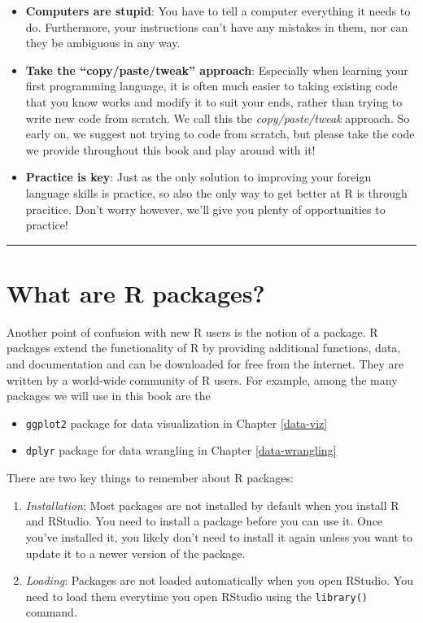 \documentclass[
]{book}
\providecommand{\tightlist}{%
  \setlength{\itemsep}{0pt}\setlength{\parskip}{0pt}}
\begin{document}
\begin{itemize}
\tightlist
\item
  \textbf{Computers are stupid}: You have to tell a computer everything it needs to do. Furthermore, your instructions can't have any mistakes in them, nor can they be ambiguous in any way.
\item
  \textbf{Take the ``copy/paste/tweak'' approach}: Especially when learning your first programming language, it is often much easier to taking existing code that you know works and modify it to suit your ends, rather than trying to write new code from scratch. We call this the \emph{copy/paste/tweak} approach. So early on, we suggest not trying to code from scratch, but please take the code we provide throughout this book and play around with it!
\item
  \textbf{Practice is key}: Just as the only solution to improving your foreign language skills is practice, so also the only way to get better at R is through pracitice. Don't worry however, we'll give you plenty of opportunities to practice!
\end{itemize}

\begin{center}\rule{0.5\linewidth}{0.5pt}\end{center}

\hypertarget{packages}{%
\section{What are R packages?}\label{packages}}

Another point of confusion with new R users is the notion of a package. R packages extend the functionality of R by providing additional functions, data, and documentation and can be downloaded for free from the internet. They are written by a world-wide community of R users. For example, among the many packages we will use in this book are the

\begin{itemize}
\tightlist
\item
  \texttt{ggplot2} package for data visualization in Chapter \ref{data-viz}
\item
  \texttt{dplyr} package for data wrangling in Chapter \ref{data-wrangling}
\end{itemize}

There are two key things to remember about R packages:

\begin{enumerate}
\def\labelenumi{\arabic{enumi}.}
\tightlist
\item
  \emph{Installation}: Most packages are not installed by default when you install R and RStudio. You need to install a package before you can use it. Once you've installed it, you likely don't need to install it again unless you want to update it to a newer version of the package.
\item
  \emph{Loading}: Packages are not loaded automatically when you open RStudio. You need to load them everytime you open RStudio using the \texttt{library()} command.
\end{enumerate}
\end{document}
